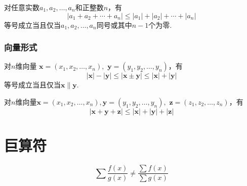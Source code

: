 对任意实数$a_1,a_2,\dots,a_n$和正整数$n$，有
\begin{equation}
	|a_1+a_2+\cdots+a_n| \leq |a_1|+|a_2|+\cdots+|a_n|
\end{equation}
等号成立当且仅当$a_1,a_2,\dots,a_n$同号或其中$n-1$个为零.

\subsubsection{向量形式}
对$n$维向量 
$\pmb{x}=(x_1,x_2,\dots,x_n),$
$\pmb{y}=(y_1,y_2,\dots,y_n)$，有
\begin{equation}
	|\pmb{x}|-|\pmb{y}|\leqslant |\pmb{x}\pm\pmb{y}|\leqslant |\pmb{x}|+|\pmb{y}|
\end{equation}
等号成立当且仅当$\pmb{x}\parallel\pmb{y}$.

对$n$维向量$\pmb{x}=(x_1,x_2,\dots,x_n),\pmb{y}=(y_1,y_2,\dots,y_n),$
$\pmb{z}=(z_1,z_2,\dots,z_n)$，有
\begin{equation}
	|\pmb{x}+\pmb{y}+\pmb{z}| \leq |\pmb{x}|+|\pmb{y}|+|\pmb{z}|
\end{equation}

\section{巨算符} \label{giant-operator}

\cite[page A36]{stewart}
\[
    \sum \dfrac{f(x)}{g(x)} \neq \dfrac{\sum f(x)}{\sum g(x)}
\]
